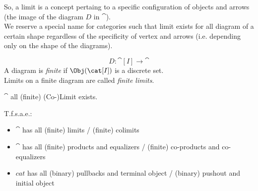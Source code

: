 \documentclass[preview]{standalone}
\begin{document}
%
So, a limit is a concept pertaing to a specific configuration of objects and arrows (the image of the diagram $D$ in $\cat$).
\\
We reserve a special name for categories such that limit exists for all diagram of a certain shape regardless of the specificity of vertex and arrows (i.e. depending only on the shape of the diagrams).
%
\begin{notation}
	\begin{displaymath}
		D: \cat[I] \rightarrow	\cat
	\end{displaymath}
	A diagram is \emph{finite} if $\Obj(\cat[I])$ is a discrete set.
	\\
	Limits on a finite diagram are called \emph{finite limits}.
\end{notation}
%
\begin{definition}
	$\cat$ \St all (finite) (Co-)Limit exists.
\end{definition}
%
\begin{proposition}
T.f.s.a.e.:
\begin{itemize}
	\item $\cat$ has all (finite) limits / (finite) colimits
	\item $\cat$ has all (finite) products and equalizers / (finite) co-products and co-equalizers
	\item $cat$ has all (binary) pullbacks and terminal object / (binary) pushout and initial object
\end{itemize}

\end{proposition}
\end{document}

